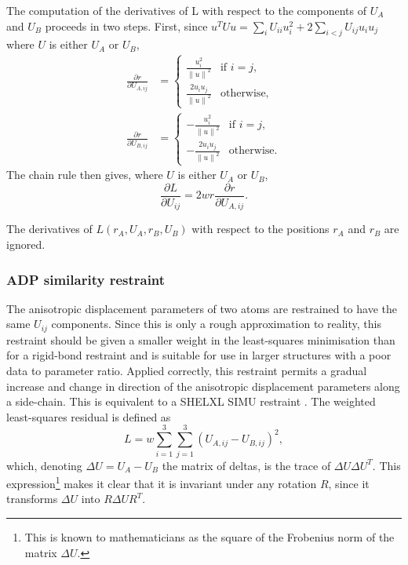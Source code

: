 \documentclass[pdf]{iucr}
\newcommand{\norm}[1]{\left\| #1 \right\|}
\newcommand{\partialder}[2]{\frac{\partial #1}{\partial #2}}
\begin{document}
The computation of the derivatives of L with respect to the components of $U_A$ and $U_B$ proceeds in two steps. First, since $u^T U u = \sum_i U_{ii} u_i^2 + 2\sum_{i<j} U_{ij}u_i u_j$ where $U$ is either $U_A$ or $U_B$, 
\begin{align}
\partialder{r}{U_{A,ij}} &= \begin{cases}
 \displaystyle \frac{u_i^2}{\norm{u}^2} & \text{if $i=j$,}\\[1em]
 \displaystyle \frac{2u_i u_j}{\norm{u}^2} & \text{otherwise,}
 \end{cases}\\
\partialder{r}{U_{B,ij}} &= \begin{cases}
 \displaystyle -\frac{u_i^2}{\norm{u}^2} & \text{if $i=j$,}\\[1em]
 \displaystyle -\frac{2u_i u_j}{\norm{u}^2} & \text{otherwise.}
 \end{cases}
\end{align}
The chain rule then gives, where $U$ is either $U_A$ or $U_B$,
\begin{equation}
\partialder{L}{U_{ij}} = 2wr \partialder{r}{U_{A,ij}}.
\end{equation}

The derivatives of $L(r_A, U_A, r_B, U_B)$ with respect to the positions $r_A$ and $r_B$ are ignored.

\subsubsection{ADP similarity restraint}
\label{ADP:similarity}
The anisotropic displacement parameters of two atoms are restrained to have the same $U_{ij}$ components. Since this is only a rough approximation to reality, this restraint should be given a smaller weight in the least-squares minimisation than for a rigid-bond restraint and is suitable for use in larger structures with a poor data to parameter ratio. Applied correctly, this restraint permits a gradual increase and change in direction of the anisotropic displacement parameters along a side-chain. This is equivalent to a SHELXL SIMU restraint .
The weighted least-squares residual is defined as
\begin{equation}
\label{eqn:ADP:restraints:similarity}
L = w \sum_{i=1}^3 \sum_{j=1}^3 (U_{A,ij} - U_{B,ij})^2,
\end{equation}
which, denoting $\Delta U=U_A - U_B$ the matrix of deltas, is the trace of $\Delta U \Delta U^T$. This expression\footnote{This is known to mathematicians as the square of the Frobenius norm of the matrix $\Delta U$.} makes it clear that it is invariant under any rotation $R$, since it transforms $\Delta U$ into $R\Delta U R^T$. 
\end{document}
